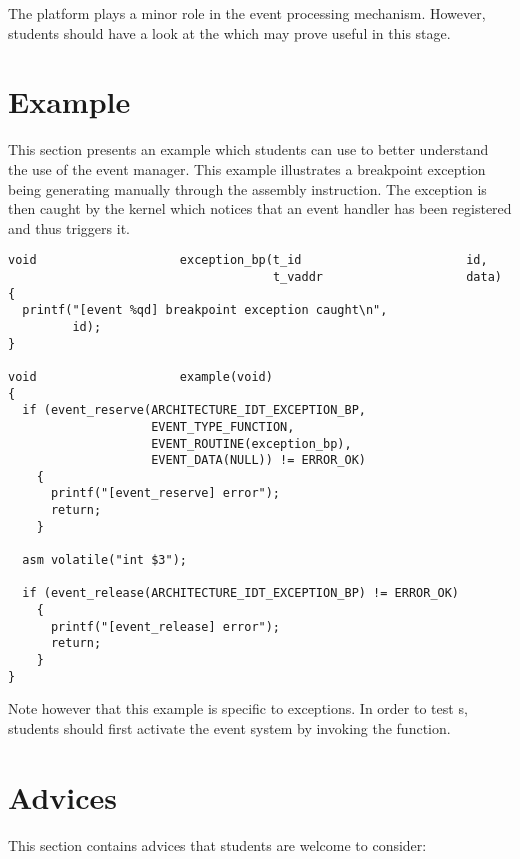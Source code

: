 The platform plays a minor role in the event processing mechanism. However,
students should have a look at the  which may prove useful in this stage.

%
%

\section{Example}

This section presents an example which students can use to better understand
the use of the event manager. This example illustrates a breakpoint exception
being generating manually through the  assembly instruction.
The exception is then caught by the kernel which notices that an event handler
has been registered and thus triggers it.

\begin{verbatim}
void                    exception_bp(t_id                       id,
                                     t_vaddr                    data)
{
  printf("[event %qd] breakpoint exception caught\n",
         id);
}

void                    example(void)
{
  if (event_reserve(ARCHITECTURE_IDT_EXCEPTION_BP,
                    EVENT_TYPE_FUNCTION,
                    EVENT_ROUTINE(exception_bp),
                    EVENT_DATA(NULL)) != ERROR_OK)
    {
      printf("[event_reserve] error");
      return;
    }

  asm volatile("int $3");

  if (event_release(ARCHITECTURE_IDT_EXCEPTION_BP) != ERROR_OK)
    {
      printf("[event_release] error");
      return;
    }
}
\end{verbatim}

Note however that this example is specific to exceptions. In order to test
s, students should first activate the event system by invoking the
 function.

%
%

\section{Advices}

This section contains advices that students are welcome to consider:

